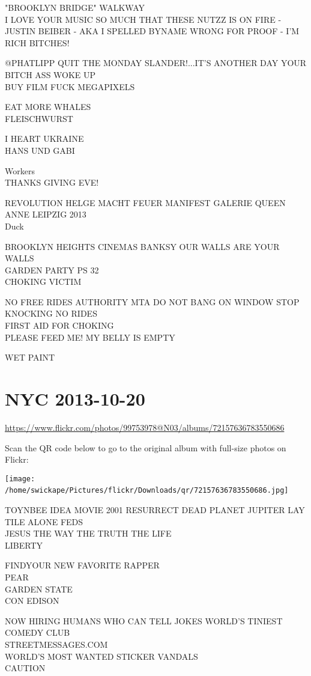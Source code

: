 \documentclass[10pt,letterpaper]{article}
\begin{document}
"BROOKLYN BRIDGE" WALKWAY\\
I LOVE YOUR MUSIC SO MUCH THAT THESE NUTZZ IS ON FIRE {-} JUSTIN BEIBER {-} AKA I SPELLED BYNAME WRONG FOR PROOF {-} I'M RICH BITCHES!

@PHATLIPP QUIT THE MONDAY SLANDER!...IT'S ANOTHER DAY YOUR BITCH ASS WOKE UP\\
BUY FILM FUCK MEGAPIXELS

EAT MORE WHALES\\
FLEISCHWURST

I HEART UKRAINE\\
HANS UND GABI

Workers\\
THANKS GIVING EVE!

REVOLUTION HELGE MACHT FEUER MANIFEST GALERIE QUEEN ANNE LEIPZIG 2013\\
Duck

BROOKLYN HEIGHTS CINEMAS BANKSY OUR WALLS ARE YOUR WALLS\\
GARDEN PARTY PS 32\\
CHOKING VICTIM

NO FREE RIDES AUTHORITY MTA DO NOT BANG ON WINDOW STOP KNOCKING NO RIDES\\
FIRST AID FOR CHOKING\\
PLEASE FEED ME! MY BELLY IS EMPTY

WET PAINT
\

\section*{NYC 2013-10-20}

\url{https://www.flickr.com/photos/99753978@N03/albums/72157636783550686}

Scan the QR code below to go to the original album with full-size photos on Flickr:

\texttt{[image: /home/swickape/Pictures/flickr/Downloads/qr/72157636783550686.jpg]}
\

TOYNBEE IDEA MOVIE 2001 RESURRECT DEAD PLANET JUPITER LAY TILE ALONE FEDS\\
JESUS THE WAY THE TRUTH THE LIFE\\
LIBERTY

FINDYOUR NEW FAVORITE RAPPER\\
PEAR\\
GARDEN STATE\\
CON EDISON

NOW HIRING HUMANS WHO CAN TELL JOKES WORLD'S TINIEST COMEDY CLUB\\
STREETMESSAGES.COM\\
WORLD'S MOST WANTED STICKER VANDALS\\
CAUTION
\end{document}
